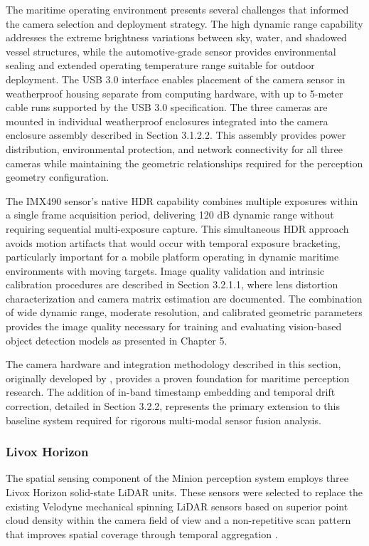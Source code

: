 \documentclass{erauthesis}
\begin{document}
The maritime operating environment presents several challenges that informed the camera selection and deployment strategy.
The high dynamic range capability addresses the extreme brightness variations between sky, water, and shadowed vessel structures, while the automotive-grade sensor provides environmental sealing and extended operating temperature range suitable for outdoor deployment.
The USB 3.0 interface enables placement of the camera sensor in weatherproof housing separate from computing hardware, with up to 5-meter cable runs supported by the USB 3.0 specification.
The three cameras are mounted in individual weatherproof enclosures integrated into the camera enclosure assembly described in Section 3.1.2.2.
This assembly provides power distribution, environmental protection, and network connectivity for all three cameras while maintaining the geometric relationships required for the perception geometry configuration.

The IMX490 sensor's native \ac{HDR} capability combines multiple exposures within a single frame acquisition period, delivering 120 dB dynamic range without requiring sequential multi-exposure capture.
This simultaneous \ac{HDR} approach avoids motion artifacts that would occur with temporal exposure bracketing, particularly important for a mobile platform operating in dynamic maritime environments with moving targets.
Image quality validation and intrinsic calibration procedures are described in Section 3.2.1.1, where lens distortion characterization and camera matrix estimation are documented.
The combination of wide dynamic range, moderate resolution, and calibrated geometric parameters provides the image quality necessary for training and evaluating vision-based object detection models as presented in Chapter 5.

The camera hardware and integration methodology described in this section, originally developed by \cite{thompson2023}, provides a proven foundation for maritime perception research.
The addition of in-band timestamp embedding and temporal drift correction, detailed in Section 3.2.2, represents the primary extension to this baseline system required for rigorous multi-modal sensor fusion analysis.

            \subsubsection{Livox Horizon}

The spatial sensing component of the Minion perception system employs three Livox Horizon solid-state \ac{LiDAR} units.
These sensors were selected to replace the existing Velodyne mechanical spinning \ac{LiDAR} sensors based on superior point cloud density within the camera field of view and a non-repetitive scan pattern that improves spatial coverage through temporal aggregation \cite{thompson2023}.
\end{document}
